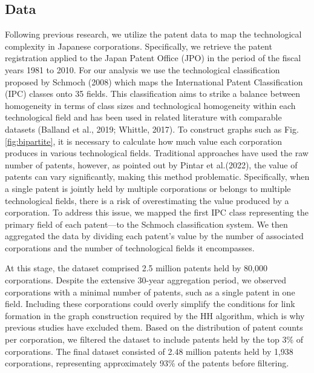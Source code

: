 \documentclass[fleqn,10pt]{wlscirep}
\begin{document}
\subsection*{Data}
Following previous research, we utilize the patent data to map the technological complexity in Japanese corporations.
Specifically, we retrieve the patent registration applied to the Japan Patent Office (JPO) in the period of the fiscal years 1981 to 2010.
For our analysis we use the technological classification proposed by Schmoch (2008) which maps the International Patent Classification (IPC) classes onto 35 fields. 
This classification aims to strike a balance between homogeneity in terms of class sizes and technological homogeneity within each technological field and has been used in related literature with comparable datasets (Balland et al., 2019; Whittle, 2017). 
To construct graphs such as Fig. \ref{fig:bipartite}, it is necessary to calculate how much value each corporation produces in various technological fields. 
Traditional approaches have used the raw number of patents, however, as pointed out by Pintar et al.(2022), the value of patents can vary significantly, making this method problematic. 
Specifically, when a single patent is jointly held by multiple corporations or belongs to multiple technological fields, there is a risk of overestimating the value produced by a corporation. 
To address this issue, we mapped the first IPC class representing the primary field of each patent—to the Schmoch classification system. We then aggregated the data by dividing each patent's value by the number of associated corporations and the number of technological fields it encompasses.

At this stage, the dataset comprised 2.5 million patents held by 80,000 corporations. Despite the extensive 30-year aggregation period, we observed corporations with a minimal number of patents, such as a single patent in one field. 
Including these corporations could overly simplify the conditions for link formation in the graph construction required by the HH algorithm, which is why previous studies have excluded them. 
Based on the distribution of patent counts per corporation, we filtered the dataset to include patents held by the top 3\% of corporations.
The final dataset consisted of 2.48 million patents held by 1,938 corporations, representing approximately 93\% of the patents before filtering.
\end{document}
